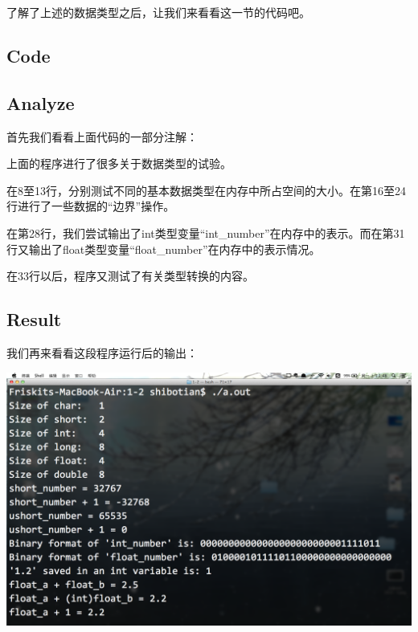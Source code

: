 了解了上述的数据类型之后，让我们来看看这一节的代码吧。

\subsection{Code}



\subsection{Analyze}
首先我们看看上面代码的一部分注解：
\begin{quote}
\showremarks
\end{quote}

上面的程序进行了很多关于数据类型的试验。

在8至13行，分别测试不同的基本数据类型在内存中所占空间的大小。在第16至24行进行了一些数据的“边界”操作。

在第28行，我们尝试输出了int类型变量“int\_number”在内存中的表示。而在第31行又输出了float类型变量“float\_number”在内存中的表示情况。

在33行以后，程序又测试了有关类型转换的内容。

\subsection{Result}
我们再来看看这段程序运行后的输出：
\\[\intextsep] 
  \begin{minipage}{\textwidth} 
    \centering 
    \includegraphics{codes/1-2/result.png}
    \label{fig:code-1-2-result} 
  \end{minipage} 
\\[\intextsep] 

